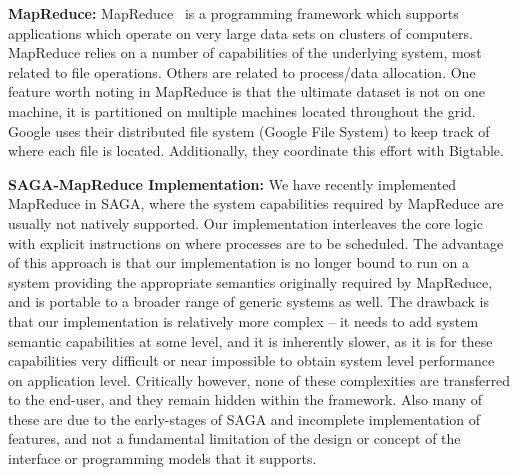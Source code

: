 \documentclass[conference,final]{IEEEtran}
\begin{document}
{\bf MapReduce: } MapReduce~\cite{mapreduce-paper} is a programming
framework which supports applications which operate on very large data
sets on clusters of computers.  MapReduce relies on a number of
capabilities of the underlying system, most related to file
operations.  Others are related to process/data
allocation. %
One feature worth noting in MapReduce is that the ultimate dataset is
not on one machine, it is partitioned on multiple machines located
throughout the grid. Google uses their distributed file system (Google
File System) to keep track of where each file is located.
Additionally, they coordinate this effort with Bigtable.



{\bf SAGA-MapReduce Implementation:} We have recently implemented
MapReduce in SAGA, where the system capabilities required by MapReduce
are usually not natively supported. Our implementation interleaves the
core logic with explicit instructions on where processes are to be
scheduled.  The advantage of this approach is that our implementation
is no longer bound to run on a system providing the appropriate
semantics originally required by MapReduce, and is portable to a
broader range of generic systems as well.  The drawback is that our
implementation is relatively more complex -- it needs to add system
semantic capabilities at some level, and it is inherently slower, as
it is for these capabilities very difficult or near impossible to
obtain system level performance on application level.  Critically
however, none of these complexities are transferred to the end-user,
and they remain hidden within the framework. Also many of these are
due to the early-stages of SAGA and incomplete implementation of
features, and not a fundamental limitation of the design or concept of
the interface or programming models that it supports.
\end{document}
